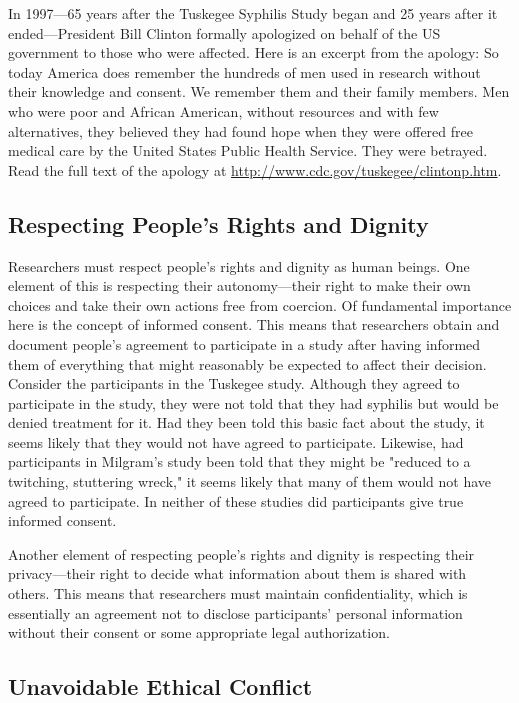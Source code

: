In 1997---65 years after the Tuskegee Syphilis Study began and 25 years after it ended---President Bill Clinton formally apologized on behalf of the US government to those who were affected. Here is an excerpt from the apology:
So today America does remember the hundreds of men used in research without their knowledge and consent. We remember them and their family members. Men who were poor and African American, without resources and with few alternatives, they believed they had found hope when they were offered free medical care by the United States Public Health Service. They were betrayed.
Read the full text of the apology at \url{http://www.cdc.gov/tuskegee/clintonp.htm}.

\subsection{Respecting People's Rights and Dignity}

Researchers must respect people's rights and dignity as human beings. One element of this is respecting
their autonomy---their right to make their own choices and take their own actions free from coercion. Of fundamental importance here is the concept of informed consent. This means that researchers obtain and document people's agreement to participate in a study after having informed them of everything that might reasonably be expected to affect their decision. Consider the participants in the Tuskegee study. Although they agreed to participate in the study, they were not told that they had syphilis but would be denied treatment for it. Had they been told this basic fact about the study, it seems likely that they would not have agreed to participate. Likewise, had participants in Milgram's study been told that they might be "reduced to a twitching, stuttering wreck," it seems likely that many of them would not have agreed to participate. In neither of these studies did participants give true informed consent.

Another element of respecting people's rights and dignity is respecting their privacy---their right to decide what information about them is shared with others. This means that researchers must maintain confidentiality, which is essentially an agreement not to disclose participants' personal information without their consent or some appropriate legal authorization.

\subsection{Unavoidable Ethical Conflict}

